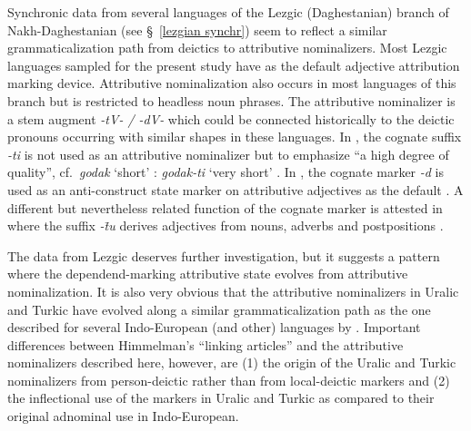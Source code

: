 {
Synchronic data from several languages of the Lezgic (Daghestanian) branch of Nakh-Daghestanian (see \S~\ref{lezgian synchr}) seem to reflect a similar grammaticalization path from deictics to attributive nominalizers. Most Lezgic languages sampled for the present study have  as the default adjective attribution marking device. Attributive nominalization also occurs in most languages of this branch but is restricted to headless noun phrases. The attributive nominalizer is a stem augment \textit{-tV- / -dV-} which could be connected historically to the deictic pronouns occurring with similar shapes in these languages. In , the cognate suffix \textit{-ti} is not used as an attributive nominalizer but to emphasize “a high degree of quality”, cf.~\textit{godak} ‘short’ : \textit{godak-ti} ‘very short’ \citep[267]{alekseev1994b}. In , the cognate marker \textit{-d} is used as an anti\hyp{}construct state marker on attributive adjectives as the default \citep[224]{alekseev1994a}. A different but nevertheless related function of the cognate marker is attested in  where the suffix \textit{-t̄u} derives adjectives from nouns, adverbs and postpositions \citep[318]{kibrik1994b}.

The data from Lezgic deserves further investigation, but it suggests a pattern where the dependend-marking attributive state evolves from attributive nominalization. It is also very obvious that the attributive nominalizers in Uralic and Turkic have evolved along a similar grammaticalization path as the one described for several Indo-European (and other) languages by \cite{himmelmann1997}. Important differences between Himmelman's “linking articles”  and the attributive nominalizers described here, however, are (1) the origin of the Uralic and Turkic nominalizers from person-deictic rather than from local-deictic markers and (2) the inflectional use of the markers in Uralic and Turkic as compared to their original adnominal use in Indo-European.

}
